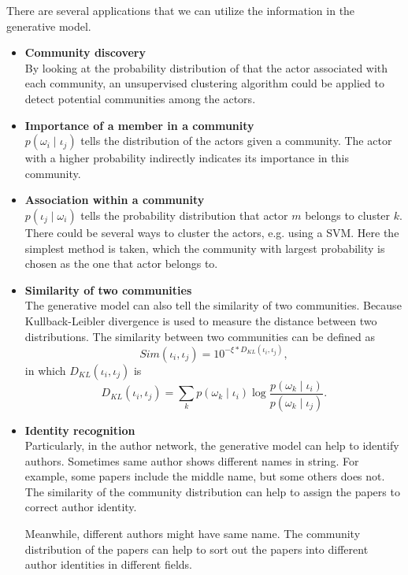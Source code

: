 \documentclass[letterpaper]{article}
\begin{document}
There are several applications that we can utilize the information in the generative model.
\begin{itemize}
\item \textbf{Community discovery} \\
By looking at the probability distribution of that the actor associated with each community, an unsupervised clustering algorithm could be applied to detect potential communities among the actors. 
\item \textbf{Importance of a member in a community} \\
$ p ( \omega_{i}  \mid \iota_{j} ) $ tells the distribution of the actors given a community.
The actor with a higher probability indirectly indicates its importance in this community.
\item \textbf{Association within a community} \\
$ p ( \iota_{j} \mid \omega_{i} ) $ tells the probability distribution that actor $ m $ belongs to cluster $ k $.
There could be several ways to cluster the actors, e.g. using a SVM.
Here the simplest method is taken, which the community with largest probability is chosen as the one that actor belongs to.
\item \textbf{Similarity of two communities} \\
The generative model can also tell the similarity of two communities.
Because Kullback-Leibler divergence is used to measure the distance between two distributions.
The similarity between two communities can be defined as 
\begin{equation}
Sim ( \iota_{i}, \iota_{j} ) = 10^{ - \xi \ast D_{KL} ( \iota_{i}, \iota_{j} ) },
\end{equation}
in which $ D_{KL} ( \iota_{i}, \iota_{j} ) $ is
\begin{equation}
D_{KL} ( \iota_{i}, \iota_{j} ) = \sum_{k} p( \omega_{k} \mid \iota_{i} ) \log \frac{ p( \omega_{k} \mid \iota_{i} ) }{ p( \omega_{k} \mid \iota_{j} ) }.
\end{equation}
\item \textbf{Identity recognition} \\
Particularly, in the author network, the generative model can help to identify authors.
Sometimes same author shows different names in string. 
For example, some papers include the middle name, but some others does not.
The similarity of the community distribution can help to assign the papers to correct author identity. 

Meanwhile, different authors might have same name.
The community distribution of the papers can help to sort out the papers into different author identities in different fields.
\end{itemize}
\end{document}
